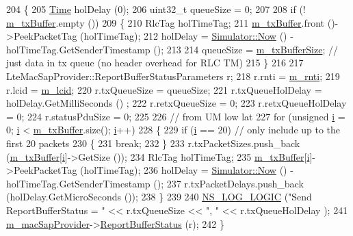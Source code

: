 \begin{DoxyCode}
204 \{
205   \hyperlink{namespacens3_1_1TracedValueCallback_a7ffd3e7c142ffe7c8a1d2db9b8de38ec}{Time} holDelay (0);
206   uint32\_t queueSize = 0;
207 
208   \textcolor{keywordflow}{if} (! \hyperlink{classns3_1_1LteRlcTm_a01ff97b4fb7201dd3feeab5a07703cbf}{m\_txBuffer}.empty ())
209     \{
210       RlcTag holTimeTag;
211       \hyperlink{classns3_1_1LteRlcTm_a01ff97b4fb7201dd3feeab5a07703cbf}{m\_txBuffer}.front ()->PeekPacketTag (holTimeTag);
212       holDelay = \hyperlink{classns3_1_1Simulator_ac3178fa975b419f7875e7105be122800}{Simulator::Now} () - holTimeTag.GetSenderTimestamp ();
213 
214       queueSize = \hyperlink{classns3_1_1LteRlcTm_a8be5f1fa70a1c3f6f13450a46e2d34a3}{m\_txBufferSize}; \textcolor{comment}{// just data in tx queue (no header overhead for RLC TM)}
215     \}
216 
217   LteMacSapProvider::ReportBufferStatusParameters r;
218   r.rnti = \hyperlink{classns3_1_1LteRlc_a48ab0a78e7f2687337075b1c8832df70}{m\_rnti};
219   r.lcid = \hyperlink{classns3_1_1LteRlc_a051085e9b27883e7ba4b98ad7242fd8a}{m\_lcid};
220   r.txQueueSize = queueSize;
221   r.txQueueHolDelay = holDelay.GetMilliSeconds () ;
222   r.retxQueueSize = 0;
223   r.retxQueueHolDelay = 0;
224   r.statusPduSize = 0;
225 
226   \textcolor{comment}{// from UM low lat}
227   \textcolor{keywordflow}{for} (\textcolor{keywordtype}{unsigned} \hyperlink{bernuolliDistribution_8m_a6f6ccfcf58b31cb6412107d9d5281426}{i} = 0; \hyperlink{bernuolliDistribution_8m_a6f6ccfcf58b31cb6412107d9d5281426}{i} < \hyperlink{classns3_1_1LteRlcTm_a01ff97b4fb7201dd3feeab5a07703cbf}{m\_txBuffer}.size(); \hyperlink{bernuolliDistribution_8m_a6f6ccfcf58b31cb6412107d9d5281426}{i}++)
228   \{
229     \textcolor{keywordflow}{if} (\hyperlink{bernuolliDistribution_8m_a6f6ccfcf58b31cb6412107d9d5281426}{i} == 20)  \textcolor{comment}{// only include up to the first 20 packets}
230     \{
231       \textcolor{keywordflow}{break};
232     \}
233     r.txPacketSizes.push\_back (\hyperlink{classns3_1_1LteRlcTm_a01ff97b4fb7201dd3feeab5a07703cbf}{m\_txBuffer}[\hyperlink{bernuolliDistribution_8m_a6f6ccfcf58b31cb6412107d9d5281426}{i}]->GetSize ());
234     RlcTag holTimeTag;
235     \hyperlink{classns3_1_1LteRlcTm_a01ff97b4fb7201dd3feeab5a07703cbf}{m\_txBuffer}[\hyperlink{bernuolliDistribution_8m_a6f6ccfcf58b31cb6412107d9d5281426}{i}]->PeekPacketTag (holTimeTag);
236     holDelay = \hyperlink{classns3_1_1Simulator_ac3178fa975b419f7875e7105be122800}{Simulator::Now} () - holTimeTag.GetSenderTimestamp ();
237     r.txPacketDelays.push\_back (holDelay.GetMicroSeconds ());
238   \}
239 
240   \hyperlink{group__logging_ga88acd260151caf2db9c0fc84997f45ce}{NS\_LOG\_LOGIC} (\textcolor{stringliteral}{"Send ReportBufferStatus = "} << r.txQueueSize << \textcolor{stringliteral}{", "} << r.txQueueHolDelay );
241   \hyperlink{classns3_1_1LteRlc_a69272d17c4e48183bb89b8dd0660c1be}{m\_macSapProvider}->\hyperlink{classns3_1_1LteMacSapProvider_a9b871a79546b8d06debd925d8863d442}{ReportBufferStatus} (r);
242 \}
\end{DoxyCode}


